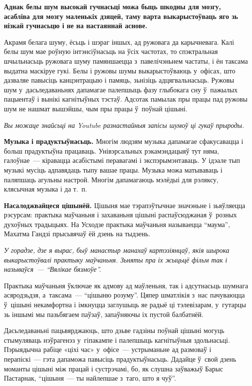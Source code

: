 \textbf{Аднак белы шум высокай гучнасьці можа быць шкодны для мозгу, асабліва для мозгу маленькіх дзяцей, таму варта выкарыстоўваць яго зь нізкай гучнасьцю і не на настаяннай аснове.}

Акрамя белага шуму, ёсьць і шэраг іншых, ад ружовага да карычневага. Калі белы шум мае роўную інтэнсіўнасьць на ўсіх частотах, то спэктральная шчыльнасьць ружовага шуму памяншаецца з~павелічэньнем частаты, і ён таксама выдатна маскіруе гукі. Белы і ружовы шумы выкарыстоўваюць у~офісах, што дазваляе павысіць канцэнтрацыю і памяць, зьнізіць адцягвальнасьць. Ружовы шум у~дасьледаваньнях дапамагае палепшыць фазу глыбокага сну ў~пажылых пацыентаў і вынікі кагнітыўных тэстаў. Адсотак памылак пры працы пад ружовы шум не нашмат вышэйшы, чым пры працы ў~поўнай цішыні.

\emph{Вы можаце знайсьці на Youtube разнастайныя запісы шумоў ці гукаў прыроды.}

\textbf{Музыка і прадуктыўнасьць.} Многім людзям музыка дапамагае сфакусавацца і больш прадуктыўна працаваць. Унівэрсальных рэкамэндацыяў тут няма, галоўнае~--- кіравацца асабістымі перавагамі і экспэрымэнтаваць. У ідэале тып музыкі мусіць адпавядаць тыпу вашае працы. Музыка можа матываваць і паляпшаць агульны настрой. Многім дапамагаюць мэлёдыі для рэляксу, клясычная музыка і да т.~п.

\textbf{Насалоджвайцеся цішынёй.} Цішыня мае тэрапэўтычнае значэньне і зьяўляецца рэсурсам: практыка маўчаньня і захаваньня цішыні распаўсюджаная ў~розных духоўных традыцыях. На Усходзе практыка маўчаньня называецца ``маума'', Махатма Гандзі прысьвячаў ёй дзень на тыдзень.

\emph{У горадзе, дзе я вырас, быў манастыр манахаў картэзіянцаў, якія шырока выкарыстоўвалі практыку маўчаньня. Зьняты пра іх жыцьцё фільм так і называўся~--- ``Вялікае бязмоўе''.}

Практыка маўчаньня ўключае як адмову ад маўленьня, так і адсутнасьць шумнага асяродзьдзя, а~таксама~--- ``цішыню розуму''. Цяпер шматлікія з~нас пачуваюцца ў~цішыні некамфортна і імкнуцца заглушыць яе радыё ці тэлевізарам, у~гутарцы зь іншымі мы пазьбягаем паўзаў, запаўняючы іх пустой балбатнёй.


Дасьледаваньні пацьвярджаюць, што дзьве гадзіны поўнай цішыні могуць стымуляваць нэўрагенэз у~гіпакампе і палепшыць кагнітыўныя здольнасьці. Пэрыядычна рабіце «ціхі час» у~офісе~--- устрыманьне ад размоваў і перапіскі~--- гэта дапаможа павысіць прадуктыўнасьць. Дадайце ў~свой дзень моманты цішыні між працай і сустрэчамі, бо, як слушна заўважыў Барыс Пастарнак, ``цішыня~--- ты найлепшае з~таго, што я чуў''.


